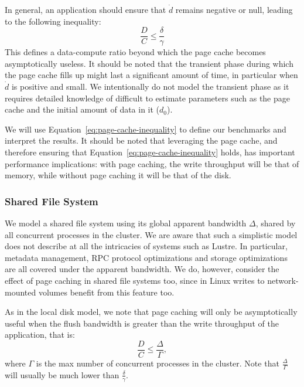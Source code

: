 \documentclass{IEEEtran}
\begin{document}
In general, an application should ensure that $\dot d$ remains negative 
or null, leading to the following inequality:
\begin{equation}
\frac{D}{C} \leq \frac{\delta}{\gamma} \label{eq:page-cache-inequality}
\end{equation}
This defines a data-compute ratio beyond which the page cache becomes 
asymptotically useless. It should be noted that the transient phase 
during which the page cache fills up might last a significant amount of time, 
in particular when $\dot d$ is positive and small. We intentionally do not model the 
transient phase as it requires detailed knowledge of difficult to estimate parameters  
such as the page cache and the initial amount 
of data in it ($d_0$).

 We will use Equation~\ref{eq:page-cache-inequality} to 
define our benchmarks and interpret the results. It 
should be noted that leveraging the page cache, and therefore ensuring 
that Equation~\ref{eq:page-cache-inequality} holds, has important 
performance implications: with page caching, the write throughput will 
be that of memory, while without page caching it will be that of the 
disk.


\subsubsection{Shared File System}

We model a shared file system using its global apparent bandwidth 
$\Delta$, shared by all concurrent processes in the cluster. We are 
aware that such a simplistic model does not describe at all the 
intricacies of systems such as Lustre. In particular, metadata 
management, RPC protocol optimizations and storage optimizations are 
all covered under the apparent bandwidth. We do, however, consider the 
effect of page caching in shared file systems too, since in Linux 
writes to network-mounted volumes benefit from this feature too.

As in the local disk model, we note that page caching will only be asymptotically
useful when the flush bandwidth is greater than the write throughput of 
the application, that is:
\begin{equation}
\frac{D}{C} \leq \frac{\Delta}{\Gamma}, \label{eq:page-cache-sharedfs}
\end{equation}
where $\Gamma$ is the max number of concurrent processes in the cluster. 
Note that $\frac{\Delta}{\Gamma}$ will usually be much lower than 
$\frac{\delta}{\gamma}$.     
\end{document}
